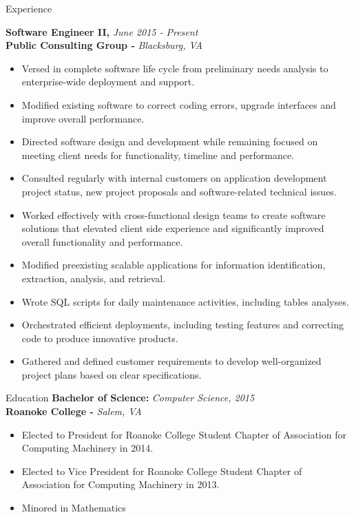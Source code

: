 \documentclass{resume} %
\begin{document}
\begin{rSection}{Experience}

{\bf Software Engineer II, }{\em June 2015 - Present} 
\\
{\bf Public Consulting Group -  }{\em Blacksburg, VA}
\begin{itemize}
\item Versed in complete software life cycle from preliminary needs analysis to enterprise-wide deployment and support.
\item Modified existing software to correct coding errors, upgrade interfaces and improve overall performance.
\item Directed software design and development while remaining focused on meeting client needs for functionality, timeline and performance.
\item Consulted regularly with internal customers on application development project status, new project proposals and software-related technical issues.
\item Worked effectively with cross-functional design teams to create software solutions that elevated client side experience and significantly improved overall functionality and performance.
\item Modified preexisting scalable applications for information identification, extraction, analysis, and retrieval.
\item Wrote SQL scripts for daily maintenance activities, including tables analyses.
\item Orchestrated efficient deployments, including testing features and correcting code to produce innovative products.
\item Gathered and defined customer requirements to develop well-organized project plans based on clear specifications.
\end{itemize}
\end{rSection}

\begin{rSection}{Education}
{\bf Bachelor of Science: }{\em Computer Science, 2015} 
\\
{\bf Roanoke College -  }{\em Salem, VA}
\begin{itemize}
\item Elected to President for Roanoke College Student Chapter of Association for Computing Machinery in 2014.
\item Elected to Vice President for Roanoke College Student Chapter of Association for Computing Machinery in 2013.
\item Minored in Mathematics
\end{itemize}
\end{rSection}
\end{document}
